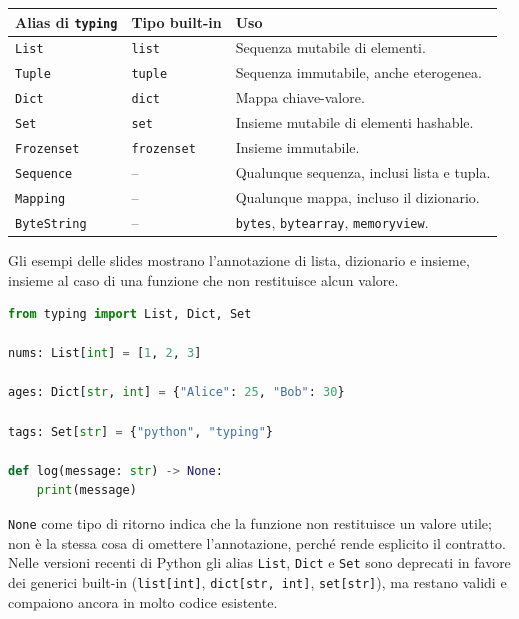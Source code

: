 \documentclass[12pt]{extarticle}
\begin{document}
\begin{center}
\small
\begin{tabular}{p{4.0cm}p{4.6cm}p{5.4cm}}
    \toprule
    \textbf{Alias di \texttt{typing}} & \textbf{Tipo built-in} & \textbf{Uso} \\
    \midrule
    \texttt{List} & \texttt{list} & Sequenza mutabile di elementi. \\
    \addlinespace
    \texttt{Tuple} & \texttt{tuple} & Sequenza immutabile, anche eterogenea. \\
    \addlinespace
    \texttt{Dict} & \texttt{dict} & Mappa chiave-valore. \\
    \addlinespace
    \texttt{Set} & \texttt{set} & Insieme mutabile di elementi hashable. \\
    \addlinespace
    \texttt{Frozenset} & \texttt{frozenset} & Insieme immutabile. \\
    \addlinespace
    \texttt{Sequence} & -- & Qualunque sequenza, inclusi lista e tupla. \\
    \addlinespace
    \texttt{Mapping} & -- & Qualunque mappa, incluso il dizionario. \\
    \addlinespace
    \texttt{ByteString} & -- & \texttt{bytes}, \texttt{bytearray}, \texttt{memoryview}. \\
    \bottomrule
\end{tabular}
\end{center}

\noindent Gli esempi delle slides mostrano l'annotazione di lista, dizionario e insieme, insieme al caso di una funzione che non restituisce alcun valore.

\begin{lstlisting}[language=Python]
from typing import List, Dict, Set

nums: List[int] = [1, 2, 3]

ages: Dict[str, int] = {"Alice": 25, "Bob": 30}

tags: Set[str] = {"python", "typing"}

def log(message: str) -> None:
    print(message)
\end{lstlisting}

\noindent \texttt{None} come tipo di ritorno indica che la funzione non restituisce un valore utile; non è la stessa cosa di omettere l'annotazione, perché rende esplicito il contratto. Nelle versioni recenti di Python gli alias \texttt{List}, \texttt{Dict} e \texttt{Set} sono deprecati in favore dei generici built-in (\texttt{list[int]}, \texttt{dict[str, int]}, \texttt{set[str]}), ma restano validi e compaiono ancora in molto codice esistente.
\end{document}
